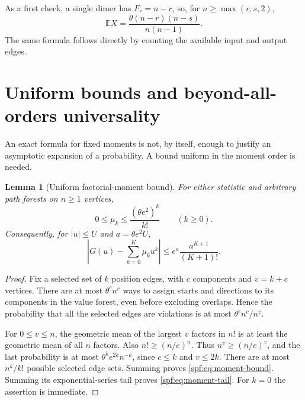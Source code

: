 \documentclass[11pt]{article}
\numberwithin{equation}{section}
\newtheorem{lemma}[theorem]{Lemma}
\theoremstyle{definition}
\theoremstyle{remark}
\theoremstyle{definition}
\newcommand{\E}{\mathbb E}
\newcommand{\fall}[2]{{#1}^{\underline{#2}}}
\begin{document}
As a first check, a single dimer has $F_r=n-r$, so, for
$n\ge\max(r,s,2)$,
\begin{equation}
 \E X=\frac{\theta(n-r)(n-s)}{n(n-1)}.
 \label{spf:eq:exact-mean}
\end{equation}
The same formula follows directly by counting the available input and output
edges.

\section{Uniform bounds and beyond-all-orders universality}
\label{spf:sec:bounds}

An exact formula for fixed moments is not, by itself, enough to justify an
asymptotic expansion of a probability. A bound uniform in the moment order is
needed.

\begin{lemma}[Uniform factorial-moment bound]
\label{spf:lem:moment-bound}
For either statistic and arbitrary path forests on $n\ge1$ vertices,
\begin{equation}
 0\le\mu_k\le\frac{(\theta e^2)^k}{k!}\qquad(k\ge0).
 \label{spf:eq:moment-bound}
\end{equation}
Consequently, for $|u|\le U$ and $a=\theta e^2U$,
\begin{equation}
 \left|G(u)-\sum_{k=0}^{K}\mu_k u^k\right|
 \le e^a\frac{a^{K+1}}{(K+1)!}.
 \label{spf:eq:moment-tail}
\end{equation}
\end{lemma}
\begin{proof}
Fix a selected set of $k$ position edges, with $c$ components and $v=k+c$
vertices. There are at most $\theta^c n^c$ ways to assign starts and directions
to its components in the value forest, even before excluding overlaps. Hence
the probability that all the selected edges are violations is at most
$\theta^c n^c/\fall nv$.

For $0\le v\le n$, the geometric mean of the largest $v$ factors in $n!$ is at
least the geometric mean of all $n$ factors. Also
$n!\ge(n/e)^n$. Thus $\fall nv\ge(n/e)^v$, and the last probability is at most
$\theta^k e^{2k}n^{-k}$, since $c\le k$ and $v\le2k$.
There are at most $n^k/k!$ possible selected edge sets. Summing proves
\eqref{spf:eq:moment-bound}. Summing its exponential-series tail proves
\eqref{spf:eq:moment-tail}. For $k=0$ the assertion is immediate.
\end{proof}
\end{document}
